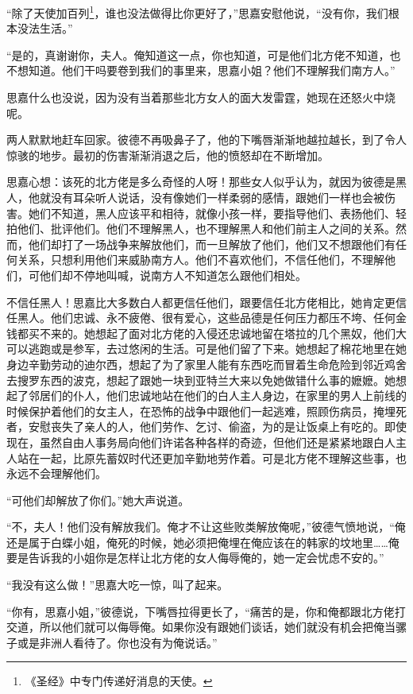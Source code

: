 \par “除了天使加百列\footnote{《圣经》中专门传递好消息的天使。}，谁也没法做得比你更好了，”思嘉安慰他说，“没有你，我们根本没法生活。”
\par “是的，真谢谢你，夫人。俺知道这一点，你也知道，可是他们北方佬不知道，也不想知道。他们干吗要卷到我们的事里来，思嘉小姐？他们不理解我们南方人。”
\par 思嘉什么也没说，因为没有当着那些北方女人的面大发雷霆，她现在还怒火中烧呢。
\par 两人默默地赶车回家。彼德不再吸鼻子了，他的下嘴唇渐渐地越拉越长，到了令人惊骇的地步。最初的伤害渐渐消退之后，他的愤怒却在不断增加。
\par 思嘉心想：该死的北方佬是多么奇怪的人呀！那些女人似乎认为，就因为彼德是黑人，他就没有耳朵听人说话，没有像她们一样柔弱的感情，跟她们一样也会被伤害。她们不知道，黑人应该平和相待，就像小孩一样，要指导他们、表扬他们、轻拍他们、批评他们。他们不理解黑人，也不理解黑人和他们前主人之间的关系。然而，他们却打了一场战争来解放他们，而一旦解放了他们，他们又不想跟他们有任何关系，只想利用他们来威胁南方人。他们不喜欢他们，不信任他们，不理解他们，可他们却不停地叫喊，说南方人不知道怎么跟他们相处。
\par 不信任黑人！思嘉比大多数白人都更信任他们，跟要信任北方佬相比，她肯定更信任黑人。他们忠诚、永不疲倦、很有爱心，这些品德是任何压力都压不垮、任何金钱都买不来的。她想起了面对北方佬的入侵还忠诚地留在塔拉的几个黑奴，他们大可以逃跑或是参军，去过悠闲的生活。可是他们留了下来。她想起了棉花地里在她身边辛勤劳动的迪尔西，想起了为了家里人能有东西吃而冒着生命危险到邻近鸡舍去搜罗东西的波克，想起了跟她一块到亚特兰大来以免她做错什么事的嬷嬷。她想起了邻居们的仆人，他们忠诚地站在他们的白人主人身边，在家里的男人上前线的时候保护着他们的女主人，在恐怖的战争中跟他们一起逃难，照顾伤病员，掩埋死者，安慰丧失了亲人的人，他们劳作、乞讨、偷盗，为的是让饭桌上有吃的。即使现在，虽然自由人事务局向他们许诺各种各样的奇迹，但他们还是紧紧地跟白人主人站在一起，比原先蓄奴时代还更加辛勤地劳作着。可是北方佬不理解这些事，也永远不会理解他们。
\par “可他们却解放了你们。”她大声说道。
\par “不，夫人！他们没有解放我们。俺才不让这些败类解放俺呢，”彼德气愤地说，“俺还是属于白蝶小姐，俺死的时候，她必须把俺埋在俺应该在的韩家的坟地里……俺要是告诉我的小姐你是怎样让北方佬的女人侮辱俺的，她一定会忧虑不安的。”
\par “我没有这么做！”思嘉大吃一惊，叫了起来。
\par “你有，思嘉小姐，”彼德说，下嘴唇拉得更长了，“痛苦的是，你和俺都跟北方佬打交道，所以他们就可以侮辱俺。如果你没有跟她们谈话，她们就没有机会把俺当骡子或是非洲人看待了。你也没有为俺说话。”
